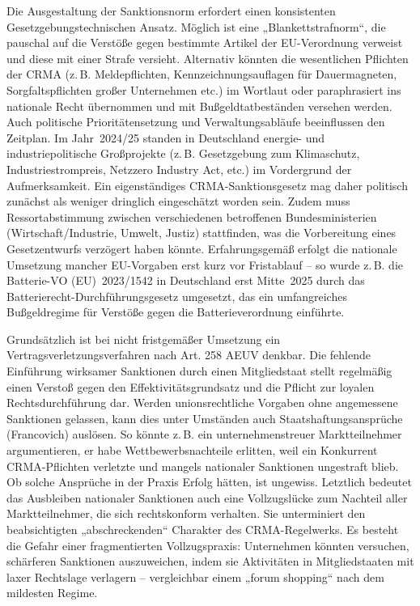 \documentclass[12pt,a4paper,oneside]{book} %
\begin{document}
Die Ausgestaltung der Sanktionsnorm erfordert einen konsistenten Gesetzgebungstechnischen Ansatz. Möglich ist eine „Blankettstrafnorm“, die pauschal auf die Verstöße gegen bestimmte Artikel der EU-Verordnung verweist und diese mit einer Strafe versieht.  Alternativ könnten die wesentlichen Pflichten der CRMA (z. B. Meldepflichten, Kennzeichnungsauflagen für Dauermagneten, Sorgfaltspflichten großer Unternehmen etc.) im Wortlaut oder paraphrasiert ins nationale Recht übernommen und mit Bußgeldtatbeständen versehen werden. Auch politische Prioritätensetzung und Verwaltungsabläufe beeinflussen den Zeitplan. Im Jahr 2024/25 standen in Deutschland energie- und industriepolitische Großprojekte (z. B. Gesetzgebung zum Klimaschutz, Industriestrompreis, Netzzero Industry Act, etc.) im Vordergrund der Aufmerksamkeit. Ein eigenständiges CRMA-Sanktionsgesetz mag daher politisch zunächst als weniger dringlich eingeschätzt worden sein. Zudem muss Ressortabstimmung zwischen verschiedenen betroffenen Bundesministerien (Wirtschaft/Industrie, Umwelt, Justiz) stattfinden, was die Vorbereitung eines Gesetzentwurfs verzögert haben könnte. Erfahrungsgemäß erfolgt die nationale Umsetzung mancher EU-Vorgaben erst kurz vor Fristablauf – so wurde z. B. die Batterie-VO (EU) 2023/1542 in Deutschland erst Mitte 2025 durch das Batterierecht-Durchführungsgesetz umgesetzt, das ein umfangreiches Bußgeldregime für Verstöße gegen die Batterieverordnung einführte.

Grundsätzlich ist bei nicht fristgemäßer Umsetzung ein Vertragsverletzungsverfahren nach Art. 258 AEUV denkbar. Die fehlende Einführung wirksamer Sanktionen durch einen Mitgliedstaat stellt regelmäßig einen Verstoß gegen den Effektivitätsgrundsatz und die Pflicht zur loyalen Rechtsdurchführung dar. Werden unionsrechtliche Vorgaben ohne angemessene Sanktionen gelassen, kann dies unter Umständen auch Staatshaftungsansprüche (Francovich) auslösen. So könnte z. B. ein unternehmenstreuer Marktteilnehmer argumentieren, er habe Wettbewerbsnachteile erlitten, weil ein Konkurrent CRMA-Pflichten verletzte und mangels nationaler Sanktionen ungestraft blieb. Ob solche Ansprüche in der Praxis Erfolg hätten, ist ungewiss. Letztlich bedeutet das Ausbleiben nationaler Sanktionen auch eine Vollzugslücke zum Nachteil aller Marktteilnehmer, die sich rechtskonform verhalten. Sie unterminiert den beabsichtigten „abschreckenden“ Charakter des CRMA-Regelwerks. Es besteht die Gefahr einer fragmentierten Vollzugspraxis: Unternehmen könnten versuchen, schärferen Sanktionen auszuweichen, indem sie Aktivitäten in Mitgliedstaaten mit laxer Rechtslage verlagern – vergleichbar einem „forum shopping“ nach dem mildesten Regime.
\end{document}
